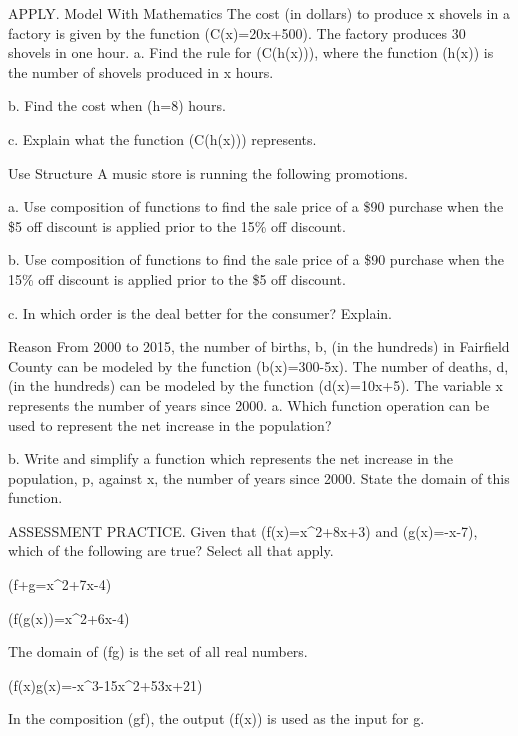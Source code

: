 \documentclass{article}
\newenvironment{practice}[2]{}{}        %
\newcommand{\answer}[1]{}               %
\newcommand{\placeholder}[2]{}          %
\newcommand{\te}[1]{}                   %
\begin{document}
\begin{practice}{31}{2}
APPLY. Model With Mathematics The cost (in dollars) to produce x shovels in a factory is given by the function (C(x)=20x+500). The factory produces 30 shovels in one hour.
a. Find the rule for (C(h(x))), where the function (h(x)) is the number of shovels produced in x hours.
\answer{a. (C(h(x))=600x+500)}
b. Find the cost when (h=8) hours.
\answer{b. \$5,300}
c. Explain what the function (C(h(x))) represents.
\answer{c. (C(h(x))) represents the cost to produce x hours' worth of shovels.}
\te{Printed h=8 hours; likely x=8 hours.}
\end{practice}
\begin{practice}{32}{3}
Use Structure A music store is running the following promotions.
\placeholder{illustration}{O'RILEY'S MUSIC drum-set advertisement: HUGE SAVINGS AT O'RILEY'S MUSIC. 5 dollars off a purchase of 20 dollars or more. Save an additional 15 percent off your total purchase when you open a charge account.}
a. Use composition of functions to find the sale price of a \$90 purchase when the \$5 off discount is applied prior to the 15\% off discount.
\answer{a. \$72.25}
b. Use composition of functions to find the sale price of a \$90 purchase when the 15\% off discount is applied prior to the \$5 off discount.
\answer{b. \$71.50}
c. In which order is the deal better for the consumer? Explain.
\answer{c. Since (\$71.50<\$72.25), it is a better deal for the consumer if the 15\% discount is applied prior to the \$5 off discount.}
\end{practice}
\begin{practice}{33}{2}
Reason From 2000 to 2015, the number of births, b, (in the hundreds) in Fairfield County can be modeled by the function (b(x)=300-5x). The number of deaths, d, (in the hundreds) can be modeled by the function (d(x)=10x+5). The variable x represents the number of years since 2000.
a. Which function operation can be used to represent the net increase in the population?
\answer{a. subtraction}
b. Write and simplify a function which represents the net increase in the population, p, against x, the number of years since 2000. State the domain of this function.
\answer{b. (p(x)=b(x)-d(x)=-15x+295); the domain is the set of all real numbers x such that (0\leq x\leq15).}
\end{practice}
\begin{practice}{34}{2}
ASSESSMENT PRACTICE. Given that (f(x)=x^2+8x+3) and (g(x)=-x-7), which of the following are true? Select all that apply.
\item (f+g=x^2+7x-4)
\item (f(g(x))=x^2+6x-4)
\item The domain of (\frac fg) is the set of all real numbers.
\item (f(x)\cdot g(x)=-x^3-15x^2+53x+21)
\item In the composition (g\circ f), the output (f(x)) is used as the input for g.
\answer{First, second, and fifth statements.}
\end{practice}
\end{document}
